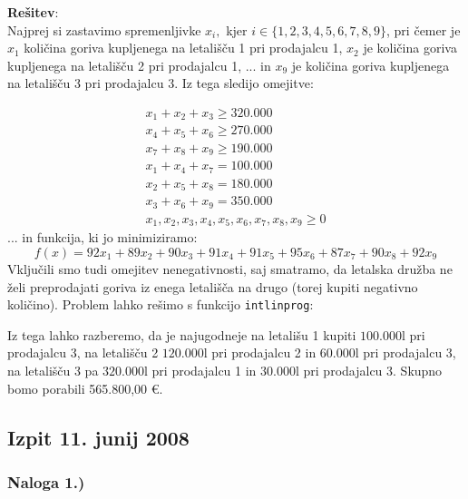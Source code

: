 \documentclass[a4paper,11pt]{article}
\begin{document}
\vspace{5mm}
\noindent \textbf{Rešitev}: \\
Najprej si zastavimo spremenljivke $x_i,$ kjer  $i  \in \{1, 2, 3, 4, 5, 6, 7, 8, 9\}$, pri čemer je $x_1$ količina goriva kupljenega na letališču 1 pri prodajalcu 1, $x_2$ je količina goriva kupljenega na letališču 2 pri prodajalcu 1, ... in $x_9$ je količina goriva kupljenega na letališču 3 pri prodajalcu 3. Iz tega sledijo omejitve:

\begin{equation} \label{con:maj2008_5}
\begin{gathered}
x_1 + x_2 + x_3 \geq 320.000 \\
x_4 + x_5 + x_6 \geq 270.000 \\
x_7 + x_8 + x_9 \geq 190.000 \\
x_1 + x_4 + x_7 = 100.000 \\
x_2 + x_5 + x_8 = 180.000 \\
x_3 + x_6 + x_9 = 350.000 \\
x_1, x_2, x_3, x_4, x_5, x_6, x_7, x_8, x_9 \geq 0
\end{gathered}
\end{equation}
... in funkcija, ki jo minimiziramo:
\begin{equation} \label{eq:maj2008_5}
f(x) = 92x_1 + 89x_2 + 90x_3 + 91x_4 + 91x_5 + 95x_6 + 87x_7 + 90x_8 + 92x_9
\end{equation}
Vključili smo tudi omejitev nenegativnosti, saj smatramo, da letalska družba ne želi preprodajati goriva iz enega letališča na drugo (torej kupiti negativno količino). Problem lahko rešimo s funkcijo \texttt{intlinprog}:

Iz tega lahko razberemo, da je najugodneje na letališu 1 kupiti $100.000\si{\litre}$ pri prodajalcu 3, na letališču 2 $120.000\si{\litre}$ pri prodajalcu 2 in $60.000\si{\litre}$ pri prodajalcu 3, na letališču 3 pa $320.000\si{\litre}$ pri prodajalcu 1 in $30.000\si{\litre}$ pri prodajalcu 3. Skupno bomo porabili 565.800,00 \euro{}.


\subsection{Izpit 11. junij 2008}

\subsubsection{Naloga 1.)}
\label{task:junij2008_1}
\end{document}
